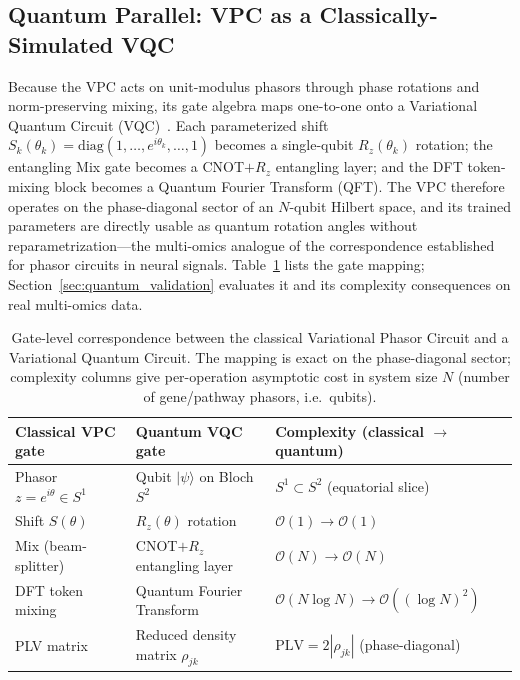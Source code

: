 \documentclass[preprint,12pt,amsmath,amssymb,superscriptaddress,floatfix]{revtex4-2}
\begin{document}
\subsection{Quantum Parallel: VPC as a Classically-Simulated VQC}
\label{subsec:vpc_vqc}

Because the VPC acts on unit-modulus phasors through phase rotations and
norm-preserving mixing, its gate algebra maps one-to-one onto a Variational
Quantum Circuit (VQC)~\cite{cerezo2021variational,benedetti2019parameterized}.
Each parameterized shift $S_k(\theta_k)=\mathrm{diag}(1,\dots,e^{i\theta_k},
\dots,1)$ becomes a single-qubit $R_z(\theta_k)$ rotation; the entangling Mix
gate becomes a CNOT$+R_z$ entangling layer; and the DFT token-mixing block
becomes a Quantum Fourier Transform (QFT). The VPC therefore operates on the
phase-diagonal sector of an $N$-qubit Hilbert space, and its trained parameters
are directly usable as quantum rotation angles without reparametrization---the
multi-omics analogue of the correspondence established for phasor circuits in
neural signals. Table~\ref{tab:cst_quantum_correspondence} lists the gate
mapping; Section~\ref{sec:quantum_validation} evaluates it and its complexity
consequences on real multi-omics data.

\begin{table}[ht]
\centering\small
\caption{Gate-level correspondence between the classical Variational Phasor
Circuit and a Variational Quantum Circuit. The mapping is exact on the
phase-diagonal sector; complexity columns give per-operation asymptotic cost in
system size $N$ (number of gene/pathway phasors, i.e.\ qubits).}
\label{tab:cst_quantum_correspondence}
\begin{tabular}{p{3.6cm}p{3.6cm}p{4.4cm}}
\toprule
Classical VPC gate & Quantum VQC gate & Complexity (classical $\to$ quantum) \\
\midrule
Phasor $z=e^{i\theta}\in S^1$ & Qubit $|\psi\rangle$ on Bloch $S^2$
  & $S^1\subset S^2$ (equatorial slice) \\
Shift $S(\theta)$ & $R_z(\theta)$ rotation
  & $\mathcal{O}(1)\to\mathcal{O}(1)$ \\
Mix (beam-splitter) & CNOT$+R_z$ entangling layer
  & $\mathcal{O}(N)\to\mathcal{O}(N)$ \\
DFT token mixing & Quantum Fourier Transform
  & $\mathcal{O}(N\log N)\to\mathcal{O}((\log N)^2)$ \\
PLV matrix & Reduced density matrix $\rho_{jk}$
  & $\mathrm{PLV}=2|\rho_{jk}|$ (phase-diagonal) \\
\bottomrule
\end{tabular}
\end{table}
\end{document}
